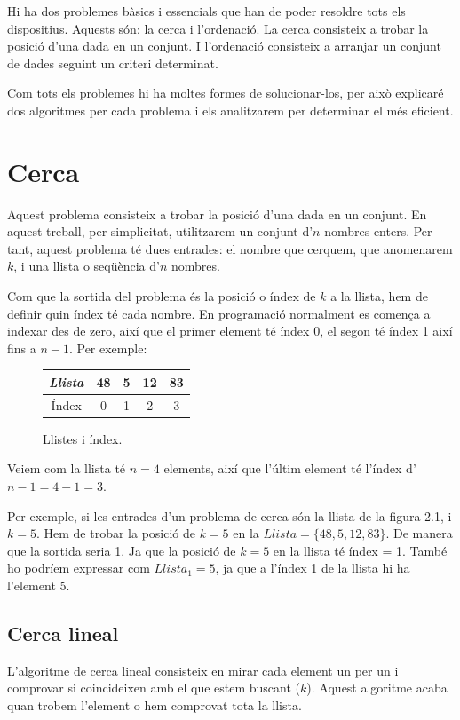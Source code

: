 Hi ha dos problemes bàsics i essencials que han de poder resoldre tots els dispositius. Aquests són: la cerca i l'ordenació. La cerca consisteix a trobar la posició d'una dada en un conjunt. I l'ordenació consisteix a arranjar un conjunt de dades seguint un criteri determinat.

Com tots els problemes hi ha moltes formes de solucionar-los, per això explicaré dos algoritmes per cada problema i els analitzarem per determinar el més eficient.

\section{Cerca}
Aquest problema consisteix a trobar la posició d'una dada en un conjunt. En aquest treball, per simplicitat, utilitzarem un conjunt d'$n$ nombres enters. Per tant, aquest problema té dues entrades: el nombre que cerquem, que anomenarem $k$, i una llista o seqüència d'$n$ nombres. 

Com que la sortida del problema és la posició o índex de $k$ a la llista, hem de definir quin índex té cada nombre. En programació normalment es comença a indexar des de zero, així que el primer element té índex 0, el segon té índex 1 així fins a $n-1$. Per exemple:
\begin{figure}[h]
    \begin{center}
    \renewcommand{\arraystretch}{1.5}
    \begin{tabular}{|c | c | c | c | c |} 
     \hline
     \textit{Llista} & 48 & 5 & 12 & 83 \\ 
     \hline
     Índex & 0 & 1 & 2 & 3 \\
     \hline
    \end{tabular}
    \end{center}
    \caption{Llistes i índex.}
    \label{fig:my_label}
\end{figure} 

Veiem com la llista té $n = 4$ elements, així que l'últim element té l'índex d'$n-1 = 4-1 = 3$. 

Per exemple, si les entrades d'un problema de cerca són la llista de la figura 2.1, i $k = 5$. Hem de trobar la posició de $k = 5$ en la $Llista = \lbrace 48, 5, 12, 83 \rbrace$. De manera que la sortida seria 1. Ja que la posició de $k = 5$ en la llista té índex = 1. També ho podríem expressar com $Llista_1 = 5$, ja que a l'índex 1 de la llista hi ha l'element 5.

\subsection{Cerca lineal}
L'algoritme de cerca lineal consisteix en mirar cada element un per un i comprovar si coincideixen amb el que estem buscant ($k$). Aquest algoritme acaba quan trobem l'element o hem comprovat tota la llista.

